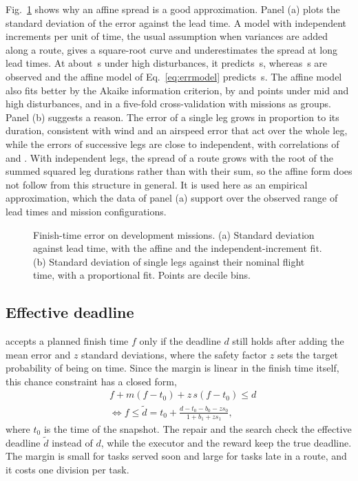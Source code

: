 Fig.~\ref{fig:errstructure} shows why an affine spread is a good approximation. Panel (a) plots the standard deviation of the
error against the lead time. A model with independent increments per unit of time, the usual assumption when variances
are added along a route, gives a square-root curve and underestimates the spread at long lead times. At about
\,s under high disturbances, it predicts \,s, whereas \,s are
observed and the affine model of Eq.~\eqref{eq:errmodel} predicts \,s. The affine model also fits
better by the Akaike
information criterion, by  and  points under mid and high disturbances, and
in a five-fold cross-validation with missions as groups. Panel (b) suggests a reason. The error of a single leg grows in
proportion to its duration, consistent with wind and an airspeed error that act over the whole leg, while the errors of
successive legs are close to independent, with correlations of  and . With
independent legs, the spread of a route grows with the root of the summed squared leg durations rather than with their
sum, so the affine form does not follow from this structure in general. It is used here as an empirical approximation,
which the data of panel (a) support over the observed range of lead times and mission configurations.

\begin{figure}[t]
\centering
{}
\caption{Finish-time error on development missions. (a) Standard deviation against lead time, with the affine and the
independent-increment fit. (b) Standard deviation of single legs against their nominal flight time, with a proportional
fit. Points are decile bins.}\label{fig:errstructure}
\end{figure}

\subsection{Effective deadline}\label{sec:cc}
\mname{} accepts a planned finish time $f$ only if the deadline $d$ still holds after adding the mean error and $z$
standard deviations, where the safety factor $z$ sets the target probability of being on time. Since the margin is
linear in the finish time itself, this chance constraint has a closed form,
\begin{equation}\label{eq:cc}
\begin{aligned}
&f+m(f-t_0)+z\,s(f-t_0)\le d\\
&\iff f\le\tilde d=t_0+\frac{d-t_0-b_0-z s_0}{1+b_1+z s_1},
\end{aligned}
\end{equation}
where $t_0$ is the time of the snapshot. The repair and the search check the effective deadline $\tilde d$ instead of
$d$, while the executor and the reward keep the true deadline. The margin is small for tasks served soon and large for
tasks late in a route, and it costs one division per task.

